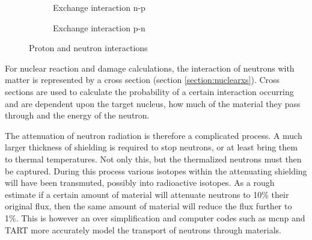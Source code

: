 \begin{figure}[htb]
\begin{subfigure}{.32\textwidth}
\centering
{}
\caption{Exchange interaction n-p\cite{pionexchange}}
\label{fig:pppion}
\end{subfigure}
\begin{subfigure}{.32\textwidth}
\centering
{}
\caption{Exchange interaction p-n\cite{pionexchange}}
\label{fig:pnpion}
\end{subfigure}
\caption{Proton and neutron interactions}
\label{fig:pninteractions}
\end{figure}

For nuclear reaction and damage calculations, the interaction of neutrons with matter is represented by a cross section (section \ref{section:nuclearxs}).  Cross sections are used to calculate the probability of a certain interaction occurring and are dependent upon the target nucleus, how much of the material they pass through and the energy of the neutron.

The attenuation of neutron radiation is therefore a complicated process.  A much larger thickness of shielding is required to stop neutrons, or at least bring them to thermal temperatures.  Not only this, but the thermalized neutrons must then be captured.  During this process various isotopes within the attenuating shielding will have been transmuted, possibly into radioactive isotopes.  As a rough estimate if a certain amount of material will attenuate neutrons to 10\% their original flux, then the same amount of material will reduce the flux further to 1\%.  This is however an over simplification and computer codes such as \acrfull{mcnp} and TART more accurately model the transport of neutrons through materials. 



